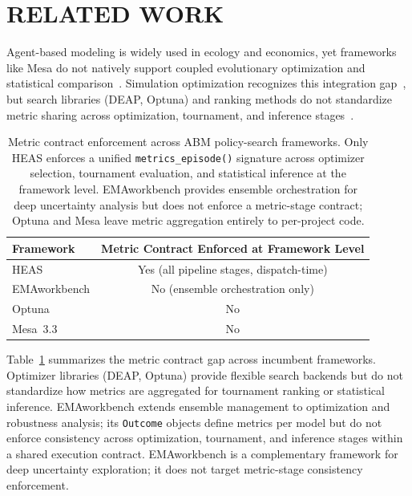 \documentclass{wscpaperproc}
\begin{document}
\section{RELATED WORK}

Agent-based modeling is widely used in ecology and economics, yet frameworks
like Mesa do not natively support coupled evolutionary optimization and
statistical comparison~\cite{kazil2020mesa}. Simulation optimization recognizes
this integration gap~\cite{fu2002optimization}, but search libraries (DEAP,
Optuna) and ranking methods do not standardize metric sharing across
optimization, tournament, and inference stages~\cite{fortin2012deap,akiba2019optuna}.


\begin{table}[ht]
\centering\small
\caption{Metric contract enforcement across ABM policy-search frameworks.
Only HEAS enforces a unified \texttt{metrics\_episode()} signature across
optimizer selection, tournament evaluation, and statistical inference at the
framework level. EMAworkbench provides ensemble orchestration for deep
uncertainty analysis but does not enforce a metric-stage contract;
Optuna and Mesa leave metric aggregation entirely to per-project code.}
\label{tab:contracts}
\begin{tabular}{lc}
\toprule
\textbf{Framework} & \textbf{Metric Contract Enforced at Framework Level} \\
\midrule
HEAS         & Yes (all pipeline stages, dispatch-time) \\
EMAworkbench & No (ensemble orchestration only) \\
Optuna       & No \\
Mesa~3.3     & No \\
\bottomrule
\end{tabular}
\end{table}

Table~\ref{tab:contracts} summarizes the metric contract gap across incumbent frameworks.
Optimizer libraries (DEAP, Optuna) provide flexible search backends but do not
standardize how metrics are aggregated for tournament ranking or statistical inference.
EMAworkbench extends ensemble management to optimization and robustness analysis; its
\texttt{Outcome} objects define metrics per model but do not enforce consistency across
optimization, tournament, and inference stages within a shared execution contract.
EMAworkbench is a complementary framework for deep uncertainty exploration; it does not
target metric-stage consistency enforcement.
\end{document}
